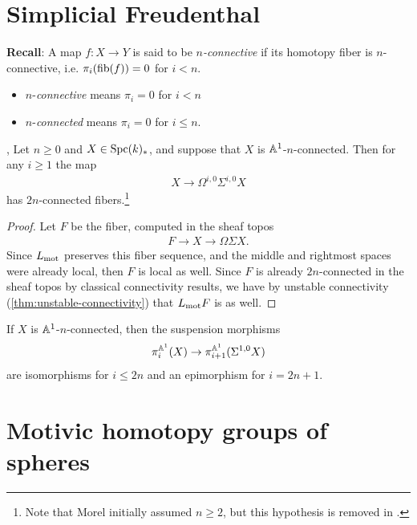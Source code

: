 \documentclass[11pt,openany]{book}
\begin{document}
\section{Simplicial Freudenthal}


\textbf{Recall}: A map $f\colon X \to Y$ is said to be $n$\textit{-connective} if its homotopy fiber is $n$-connective, i.e. $\pi_i(\mathrm{fib}(f)) = 0$ for $i<n$.
\begin{itemize}
    \item $n$-\textit{connective} means $\pi_i=0$ for $i<n$
    \item $n$-\textit{connected} means $\pi_i =0 $ for $i\le n$.
\end{itemize}


\begin{theorem} \cite[6.61]{Morel}, \cite[3.7]{ABH-nilpotent} Let $n\ge 0$ and $X\in \mathrm{Spc}(k)_\ast$, and suppose that $X$ is $\mathbb{A}^1$-$n$-connected. Then for any $i \ge 1$ the map
\begin{align*}
    X \to \Omega^{i,0}\Sigma^{i,0}X
\end{align*}
has $2n$-connected fibers.\footnote{Note that Morel initially assumed $n \ge 2$, but this hypothesis is removed in \cite{ABH-nilpotent}.}
\end{theorem}
\begin{proof} Let $F$ be the fiber, computed in the sheaf topos
\begin{align*}
    F \to X \to \Omega \Sigma X.
\end{align*}
Since $L_{\mathrm{mot}}$ preserves this fiber sequence, and the middle and rightmost spaces were already local, then $F$ is local as well. Since $F$ is already $2n$-connected in the sheaf topos by classical connectivity results, we have by unstable connectivity (\autoref{thm:unstable-connectivity}) that $L_{\mathrm{mot}} F$ is as well.
\end{proof}

\begin{corollary} If $X$ is $\mathbb{A}^1$-$n$-connected, then the suspension morphisms
\begin{align*}
    \pi_i^{\mathbb{A}^1}(X) \to \pi_{i+1}^{\mathbb{A}^1}(\Sigma^{1,0}X)
\end{align*}
are isomorphisms for $i\le 2n$ and an epimorphism for $i=2n+1$.
\end{corollary}

\section{Motivic homotopy groups of spheres}
\end{document}
